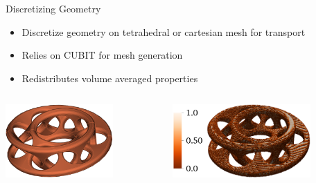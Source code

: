 \documentclass[xcolor=x11names,compress]{beamer}
\begin{document}
\begin{frame}{Discretizing Geometry}
    \begin{itemize}
        \item Discretize geometry on tetrahedral or cartesian mesh for transport
        \item Relies on CUBIT for mesh generation
        \item Redistributes volume averaged properties
    \end{itemize}
    \begin{columns}
        \begin{column}{0.45\textwidth}
            \includegraphics[height=1.1in,clip]{mobius_cad.png}
  	    \end{column}
 	    \begin{column}{0.45\textwidth}
            \includegraphics[height=1.1in,clip]{mobius_mesh.png}
        \end{column}
    \end{columns}
\end{frame}
\end{document}
